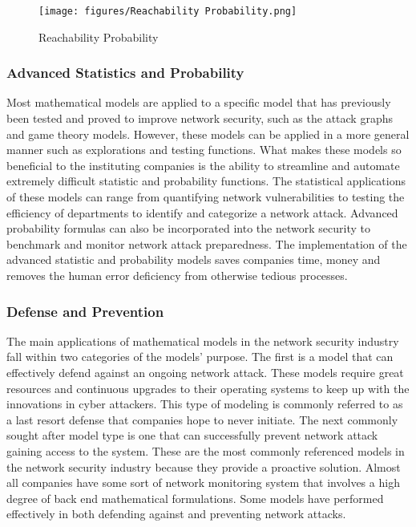 \documentclass{article}
\begin{document}
\begin{figure}
    \centering
    \texttt{[image: figures/Reachability Probability.png]}
    \caption{Reachability Probability}
\end{figure}

\subsubsection{Advanced Statistics and Probability}
Most mathematical models are applied to a specific model that has previously been tested and proved to improve network security, such as the attack graphs and game theory models. However, these models can be applied in a more general manner such as explorations and testing functions. What makes these models so beneficial to the instituting companies is the ability to streamline and automate extremely difficult statistic and probability functions. The statistical applications of these models can range from quantifying network vulnerabilities to testing the efficiency of departments to identify and categorize a network attack. Advanced probability formulas can also be incorporated into the network security to benchmark and monitor network attack preparedness. The implementation of the advanced statistic and probability models saves companies time, money and removes the human error deficiency from otherwise tedious processes. 

\subsubsection{Defense and Prevention}
The main applications of mathematical models in the network security industry fall within two categories of the models’ purpose. The first is a model that can effectively defend against an ongoing network attack. These models require great resources and continuous upgrades to their operating systems to keep up with the innovations in cyber attackers. This type of modeling is commonly referred to as a last resort defense that companies hope to never initiate. The next commonly sought after model type is one that can successfully prevent network attack gaining access to the system. These are the most commonly referenced models in the network security industry because they provide a proactive solution. Almost all companies have some sort of network monitoring system that involves a high degree of back end mathematical formulations. Some models have performed effectively in both defending against and preventing network attacks. 
\end{document}
